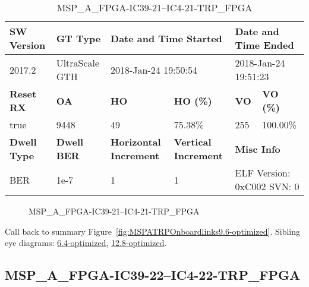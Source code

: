 \begin{table}[h]
\centering
\caption{MSP\_A\_FPGA-IC39-21--IC4-21-TRP\_FPGA}
\label{tab:MSPAFPGAIC3921IC421TRPFPGA9.6-optimized}
\begin{tabular}{@{}|l|l|l|l|l|l|@{}}
\toprule
\textbf{SW Version}                & \textbf{GT Type}   & \multicolumn{2}{l|}{\textbf{Date and Time Started}}            & \multicolumn{2}{l|}{\textbf{Date and Time Ended}}        \\ \midrule
2017.2                       & UltraScale GTH          & \multicolumn{2}{l|}{2018-Jan-24 19:50:54}                   & \multicolumn{2}{l|}{2018-Jan-24 19:51:23}               \\ \midrule
\textbf{Reset RX}                  & \textbf{OA} & \textbf{HO}   & \textbf{HO (\%)} & \textbf{VO} & \textbf{VO (\%)} \\ \midrule
true & 9448        & 49          & 75.38\%        & 255        & 100.00\%       \\ \midrule
\textbf{Dwell Type}                & \textbf{Dwell BER} & \textbf{Horizontal Increment} & \textbf{Vertical Increment}    & \multicolumn{2}{l|}{\textbf{Misc Info}}                  \\ \midrule
BER                            & 1e-7        & 1        & 1           & \multicolumn{2}{l|}{ELF Version: 0xC002 SVN: 0}                         \\ \bottomrule
\end{tabular}
\end{table}

\begin{figure}[h]
\caption{MSP\_A\_FPGA-IC39-21--IC4-21-TRP\_FPGA} \label{fig:MSPAFPGAIC3921IC421TRPFPGA9.6-optimized}
\end{figure}

Call back to summary Figure~\ref{fig:MSPATRPOnboardlinks9.6-optimized}.
Sibling eye diagrams: \hyperref[sec:MSPAFPGAIC3921IC421TRPFPGA6.4-optimized]{6.4-optimized}, \hyperref[sec:MSPAFPGAIC3921IC421TRPFPGA12.8-optimized]{12.8-optimized}.

\clearpage
\newpage


\subsection{MSP\_A\_FPGA-IC39-22--IC4-22-TRP\_FPGA}\label{sec:MSPAFPGAIC3922IC422TRPFPGA9.6-optimized}

